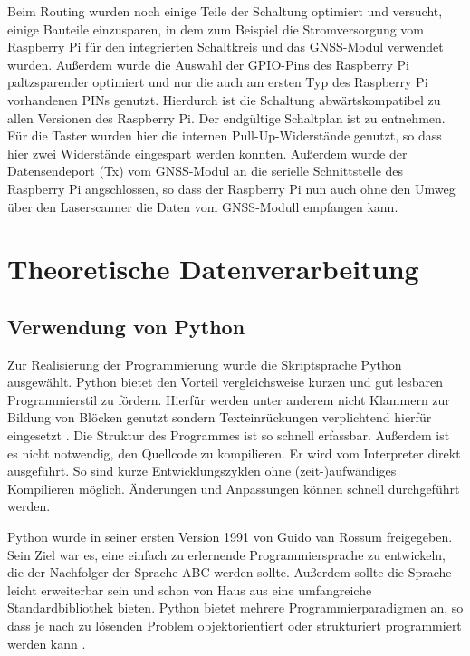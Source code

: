 \documentclass[a4paper,12pt,bibliography=totoc, listof=totoc,titlepage,pointlessnumbers]{scrreprt}
\begin{document}
Beim Routing wurden noch einige Teile der Schaltung optimiert und versucht, einige Bauteile einzusparen, in dem zum Beispiel die Stromversorgung vom Raspberry Pi für den integrierten Schaltkreis und das GNSS-Modul verwendet wurden. Außerdem wurde die Auswahl der GPIO-Pins des Raspberry Pi paltzsparender optimiert und nur die auch am ersten Typ des Raspberry Pi vorhandenen PINs genutzt. Hierdurch ist die Schaltung abwärtskompatibel zu allen Versionen des Raspberry Pi. Der endgültige Schaltplan ist 
zu entnehmen. Für die Taster wurden hier die internen Pull-Up-Widerstände genutzt, so dass hier zwei Widerstände eingespart werden konnten. Außerdem wurde der Datensendeport (Tx) vom GNSS-Modul an die serielle Schnittstelle des Raspberry Pi angschlossen, so dass der Raspberry Pi nun auch ohne den Umweg über den Laserscanner die Daten vom GNSS-Modull empfangen kann.



\chapter{Theoretische Datenverarbeitung}
\label{c:datenverarbeitung}

\section{Verwendung von Python}
Zur Realisierung der Programmierung wurde die Skriptsprache Python ausgewählt. Python bietet den Vorteil vergleichsweise kurzen und gut lesbaren Programmierstil zu fördern. Hierfür werden unter anderem nicht Klammern zur Bildung von Blöcken genutzt sondern Texteinrückungen verplichtend hierfür eingesetzt \citep[S. 13f]{python}. Die Struktur des Programmes ist so schnell erfassbar. Außerdem ist es nicht notwendig, den Quellcode zu kompilieren. Er wird vom Interpreter direkt ausgeführt. So sind kurze Entwicklungszyklen ohne (zeit-)aufwändiges Kompilieren möglich. Änderungen und Anpassungen können schnell durchgeführt werden.

Python wurde in seiner ersten Version 1991 von Guido van Rossum freigegeben. Sein Ziel war es, eine einfach zu erlernende Programmiersprache zu entwickeln, die der Nachfolger der Sprache ABC werden sollte. Außerdem sollte die Sprache leicht erweiterbar sein und schon von Haus aus eine umfangreiche Standardbibliothek bieten. Python bietet mehrere Programmierparadigmen an, so dass je nach zu lösenden Problem objektorientiert oder strukturiert programmiert werden kann \citep[S. 14]{python}.
\end{document}
